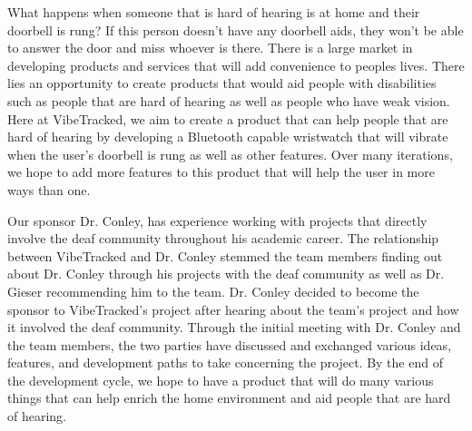 
What happens when someone that is hard of hearing is at home and their doorbell is rung? If this person doesn't have any doorbell aids, they won't be able to answer the door and miss whoever is there. There is a large market in developing products and services that will add convenience to peoples lives. There lies an opportunity to create products that would aid people with disabilities such as people that are hard of hearing as well as people who have weak vision. Here at VibeTracked, we aim to create a product that can help people that are hard of hearing by developing a Bluetooth capable wristwatch that will vibrate when the user's doorbell is rung as well as other features. Over many iterations, we hope to add more features to this product that will help the user in more ways than one. 

Our sponsor Dr. Conley, has experience working with projects that directly involve the deaf community throughout his academic career. The relationship between VibeTracked and Dr. Conley stemmed the team members finding out about Dr. Conley through his projects with the deaf community as well as Dr. Gieser recommending him to the team. Dr. Conley decided to become the sponsor to VibeTracked's project after hearing about the team's project and how it involved the deaf community. Through the initial meeting with Dr. Conley and the team members, the two parties have discussed and exchanged various ideas, features, and development paths to take concerning the project. By the end of the development cycle, we hope to have a product that will do many various things that can help enrich the home environment and aid people that are hard of hearing. 